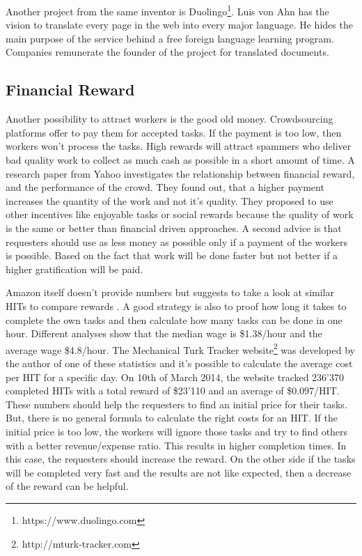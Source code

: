 Another project from the same inventor is Duolingo\footnote{https://www.duolingo.com}. Luis von Ahn has the vision to translate every page in the web into every major language. He hides the main purpose of the service behind a free foreign language learning program. Companies remunerate the founder of the project for translated documents.

\subsection{Financial Reward}
Another possibility to attract workers is the good old money. Crowdsourcing platforms offer to pay them for accepted tasks. If the payment is too low, then workers won't process the tasks. High rewards will attract spammers who deliver bad quality work to collect as much cash as possible in a short amount of time. A research paper from Yahoo \cite{mason} investigates the relationship between financial reward, and the performance of the crowd. They found out, that a higher payment increases the quantity of the work and not it's quality. They proposed to use other incentives like enjoyable tasks or social rewards because the quality of work is the same or better than financial driven approaches. A second advice is that requesters should use as less money as possible only if a payment of the workers is possible. Based on the fact that work will be done faster but not better if a higher gratification will be paid.

Amazon itself doesn't provide numbers but suggests to take a look at similar HITs to compare rewards \cite{mturk_bestpractices}. A good strategy is also to proof how long it takes to complete the own tasks and then calculate how many tasks can be done in one hour. Different analyses \cite{chilton,ipeirotis} show that the median wage is \$1.38/hour and the average wage \$4.8/hour. The Mechanical Turk Tracker website\footnote{http://mturk-tracker.com} was developed by the author of one of these statistics \cite{ipeirotis} and it's possible to calculate the average cost per HIT for a specific day. On 10th of March 2014, the website tracked 236'370 completed HITs with a total reward of \$23'110 and an average of \$0.097/HIT. These numbers should help the requesters to find an initial price for their tasks. But, there is no general formula to calculate the right costs for an HIT. If the initial price is too low, the workers will ignore those tasks and try to find others with a better revenue/expense ratio. This results in higher completion times. In this case, the requesters should increase the reward. On the other side if the tasks will be completed very fast and the results are not like expected, then a decrease of the reward can be helpful.

